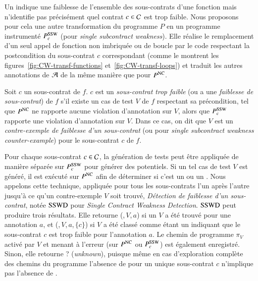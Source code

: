 Un \GSWCE indique une faiblesse de l'ensemble des sous-contrats d'une fonction
mais n'identifie pas précisément quel contrat $c\in{\ensuremath\mathcal{C}}$ est trop faible.
Nous proposons pour cela une autre transformation du programme $P$ en un
programme instrumenté $P_c^{\mathrm{SSW}}$ (pour {\em single subcontract weakness}).
Elle réalise le remplacement d'un seul appel de fonction non imbriquée ou de
boucle par le code respectant la postcondition du sous-contrat $c$ correspondant
(comme le montrent les figures~\ref{fig:CW-transf-functions}
et~\ref{fig:CW-transf-loops}) et traduit les autres annotations de ${\mathcal{A}}$ de la
même manière que pour $P^{\mathrm{NC}}$.

\begin{definition} 
  \label{def:SSW}
  Soit $c$ un sous-contrat de $f$.
  $c$ est un \emph{sous-contrat trop faible} (ou a une
  \emph{faiblesse de sous-contrat}) de $f$ s'il existe un cas de test $V$ de
   $f$ respectant sa précondition, tel que $P^{\mathrm{NC}}$ ne rapporte aucune violation
  d'annotation sur $V$, alors que $P_c^{\mathrm{SSW}}$ rapporte une violation
  d'annotation sur $V$.
  Dans ce cas, on dit que $V$ est un
  \emph{contre-exemple de faiblesse d'un sous-contrat} (ou \SSWCE pour
  \textit{single subcontract weakness counter-example}) pour le sous-contrat
  $c$ de $f$.
\end{definition}

Pour chaque sous-contrat $c\in{\ensuremath\mathcal{C}}$, la génération de tests peut être appliquée
de manière séparée sur $P_{c}^{\mathrm{SSW}}$ pour générer des \SSWCE potentiels.
Si un tel cas de test $V$ est généré, il est exécuté sur $P^{\mathrm{NC}}$ afin de
déterminer si c'est un \NCCE ou un \SSWCE.
Nous appelons cette technique, appliquée pour tous les sous-contrats l'un après
l'autre jusqu'à ce qu'un contre-exemple $V$ soit trouvé,
\emph{Détection de faiblesse d'un sous-contrat}, notée $\mathrm{SSWD}$ pour
\textit{Single Contract Weakness Detection}.
$\mathrm{SSWD}$ peut produire trois résultats.
Elle retourne (\nc,\,$V$,\,$a$) si un \NCCE $V$ a été trouvé pour une annotation
$a$, et (\cw,\,$V$,\,$a$,\,$\{c\}$) si $V$ a été classé comme étant un \SSWCE
indiquant que le sous-contrat $c$ est trop faible pour l'annotation $a$.
Le chemin de programme $\pi_V$ activé par $V$ et menant à l'erreur (sur $P^{\mathrm{NC}}$
ou $P_c^{\mathrm{SSW}}$) est également enregistré.
Sinon, elle retourne \textsf{?} ({\em unknown}), puisque même en cas
d'exploration complète des chemins du programme l'absence de \SSWCE pour un
unique sous-contrat $c$ n'implique pas l'absence de \GSWCE.

